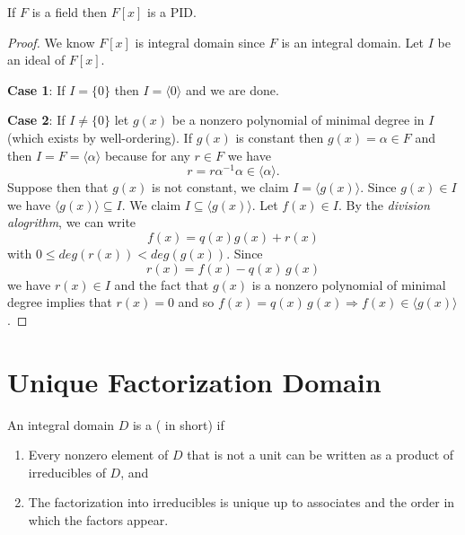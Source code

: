 \begin{theorem}
    If $F$ is a field then $F[x]$ is a PID.
\end{theorem}
\begin{proof}
    We know $F[x]$ is integral domain since $F$ is an integral domain. Let $I$ be an ideal of 
    $F[x]$.

    \textbf{Case 1}: If $I = \{ 0 \}$ then $I = \langle 0 \rangle$ and we are done.

    \textbf{Case 2}: If $I \neq \{ 0 \}$ let $g(x)$ be a nonzero polynomial of minimal degree in 
    $I$ (which exists by well-ordering). If $g(x)$ is constant then $g(x) = \alpha \in F$ and then 
    $I = F = \langle \alpha \rangle$ because for any $r \in F$ we have 
    \[
        r = r\alpha^{-1} \alpha \in \langle \alpha \rangle.
    \]
    Suppose then that $g(x)$ is not constant, we claim $I = \langle g(x) \rangle$. Since 
    $g(x) \in I$ we have $\langle g(x) \rangle \subseteq I$. We claim $I \subseteq \langle g(x) \rangle$. 
    Let $f(x) \in I$. By the \textit{division alogrithm}, we can write 
    \[
        f(x) = q(x)g(x) + r(x)
    \]
    with $0 \leq deg(r(x)) < deg(g(x))$. Since 
    \[
        r(x) = f(x) - q(x)\, g(x)
    \]
    we have $r(x) \in I$ and the fact that $g(x)$ is a nonzero polynomial of minimal degree implies 
    that $r(x) = 0$ and so $f(x) = q(x)\, g(x) \Longrightarrow  f(x) \in \langle g(x) \rangle$.
\end{proof}

\section{Unique Factorization Domain}

\begin{definition}
    An integral domain $D$ is a  ( in short) 
    if 
    \begin{enumerate}
        \item Every nonzero element of $D$ that is not a unit can be written as a product of 
        irreducibles of $D$, and
        \item The factorization into irreducibles is unique up to associates and the order in which 
        the factors appear. 
    \end{enumerate}
\end{definition}

